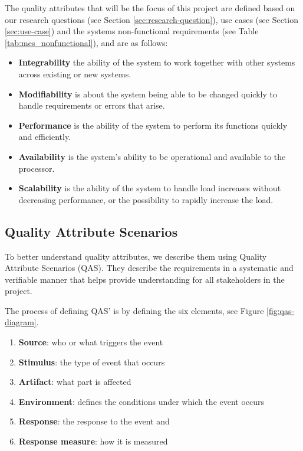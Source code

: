 The quality attributes that will be the focus of this project are defined based on our research questions (see Section \ref{sec:research-question}), use cases (see Section \ref{sec:use-case}) and the systems non-functional requirements (see Table \ref{tab:mes_nonfunctional}), and are as follows:
\begin{itemize}
    \item \textbf{Integrability} the ability of the system to work together with other systems across existing or new systems.
    \item \textbf{Modifiability} is about the system being able to be changed quickly to handle requirements or errors that arise.
    \item \textbf{Performance} is the ability of the system to perform its functions quickly and efficiently.
    \item \textbf{Availability} is the system's ability to be operational and available to the processor.
     \item \textbf{Scalability} is the ability of the system to handle load increases without decreasing performance, or the possibility to rapidly increase the load.
\end{itemize}





\subsection{Quality Attribute Scenarios}
To better understand quality attributes, we describe them using Quality Attribute Scenarios (QAS). They describe the requirements in a systematic and verifiable manner that helps provide understanding for all stakeholders in the project.

The process of defining QAS' is by defining the six elements, see Figure \ref{fig:qas-diagram}.

\begin{enumerate}
    \item \textbf{Source}: who or what triggers the event
    \item \textbf{Stimulus}: the type of event that occurs
    \item \textbf{Artifact}: what part is affected
    \item \textbf{Environment}: defines the conditions under which the event occurs
    \item \textbf{Response}: the response to the event and 
    \item \textbf{Response measure}: how it is measured
\end{enumerate}

